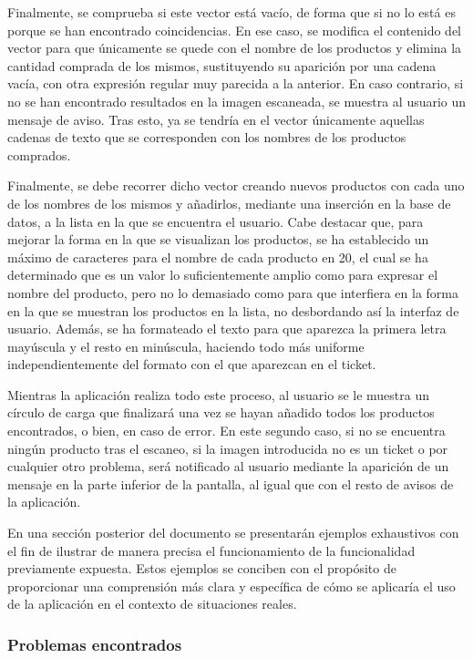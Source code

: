\documentclass{article}
\begin{document}
Finalmente, se comprueba si este vector está vacío, de forma que si no lo está es porque se han encontrado coincidencias. En ese caso, se modifica el contenido del vector para que únicamente se quede con el nombre de los productos y elimina la cantidad comprada de los mismos, sustituyendo su aparición por una cadena vacía, con otra expresión regular muy parecida a la anterior. En caso contrario, si no se han encontrado resultados en la imagen escaneada, se muestra al usuario un mensaje de aviso. Tras esto, ya se tendría en el vector únicamente aquellas cadenas de texto que se corresponden con los nombres de los productos comprados.

Finalmente, se debe recorrer dicho vector creando nuevos productos con cada uno de los nombres de los mismos y añadirlos, mediante una inserción en la base de datos, a la lista en la que se encuentra el usuario. Cabe destacar que, para mejorar la forma en la que se visualizan los productos, se ha establecido un máximo de caracteres para el nombre de cada producto en 20, el cual se ha determinado que es un valor lo suficientemente amplio como para expresar el nombre del producto, pero no lo demasiado como para que interfiera en la forma en la que se muestran los productos en la lista, no desbordando así la interfaz de usuario. Además, se ha formateado el texto para que aparezca la primera letra mayúscula y el resto en minúscula, haciendo todo más uniforme independientemente del formato con el que aparezcan en el ticket.

Mientras la aplicación realiza todo este proceso, al usuario se le muestra un círculo de carga que finalizará una vez se hayan añadido todos los productos encontrados, o bien, en caso de error. En este segundo caso, si no se encuentra ningún producto tras el escaneo, si la imagen introducida no es un ticket o por cualquier otro problema, será notificado al usuario mediante la aparición de un mensaje en la parte inferior de la pantalla, al igual que con el resto de avisos de la aplicación.

En una sección posterior del documento se presentarán ejemplos exhaustivos con el fin de ilustrar de manera precisa el funcionamiento de la funcionalidad previamente expuesta. Estos ejemplos se conciben con el propósito de proporcionar una comprensión más clara y específica de cómo se aplicaría el uso de la aplicación en el contexto de situaciones reales.

\subsubsection{Problemas encontrados}
\end{document}
